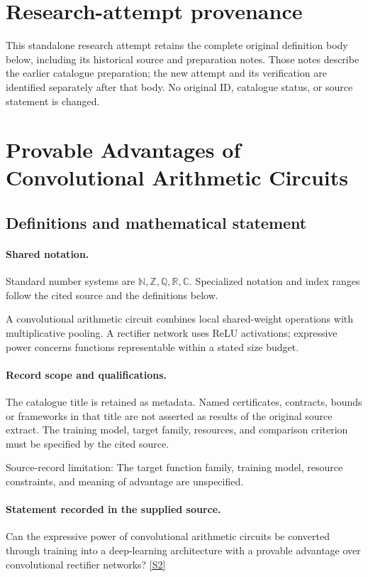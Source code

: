 \documentclass[11pt]{article}
\begin{document}
\section*{Research-attempt provenance}
This standalone research attempt retains the complete original definition body below,
including its historical source and preparation notes. Those notes describe the
earlier catalogue preparation; the new attempt and its verification are identified
separately after that body. No original ID, catalogue status, or source statement is changed.

\section{Provable Advantages of Convolutional Arithmetic Circuits}\label{statement}

\subsection{Definitions and mathematical statement}

\paragraph{Shared notation.}Standard number systems are $\mathbb N,\mathbb Z,\mathbb Q,\mathbb R,\mathbb C$. Specialized notation and index ranges follow the cited source and the definitions below.


A convolutional arithmetic circuit combines local shared-weight operations with multiplicative pooling. A rectifier network uses ReLU activations; expressive power concerns functions representable within a stated size budget.
\paragraph{Record scope and qualifications.}
The catalogue title is retained as metadata. Named certificates, contracts, bounds or frameworks in that title are not asserted as results of the original source extract.
The training model, target family, resources, and comparison criterion must be specified by the cited source.

Source-record limitation: The target function family, training model, resource constraints, and meaning of advantage are unspecified.
\paragraph{Statement recorded in the supplied source.}
Can the expressive power of convolutional arithmetic circuits be converted through training into a deep-learning architecture with a provable advantage over convolutional rectifier networks? \href{https://doi.org/10.4171/owr/2018/14}{[S2]}
\end{document}
